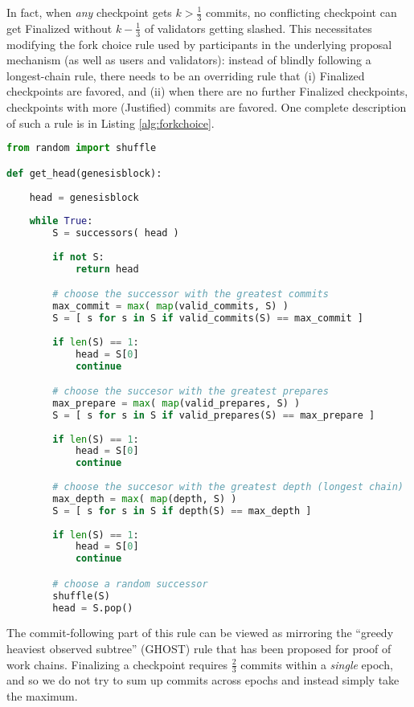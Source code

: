 \documentclass[12pt]{article}
\begin{document}
In fact, when \textit{any} checkpoint gets $k > \frac{1}{3}$ commits, no conflicting checkpoint can get Finalized without $k - \frac{1}{3}$ of validators getting slashed. This necessitates modifying the fork choice rule used by participants in the underlying proposal mechanism (as well as users and validators): instead of blindly following a longest-chain rule, there needs to be an overriding rule that (i) Finalized checkpoints are favored, and (ii) when there are no further Finalized checkpoints, checkpoints with more (Justified) commits are favored.  One complete description of such a rule is in Listing \ref{alg:forkchoice}.

\begin{lstlisting}[language=Python, caption={Algorithm for determining the head}, captionpos=b, label={alg:forkchoice}]
from random import shuffle

def get_head(genesisblock):
    
    head = genesisblock
    
    while True:
        S = successors( head )
        
        if not S:
            return head

        # choose the successor with the greatest commits
        max_commit = max( map(valid_commits, S) )        
        S = [ s for s in S if valid_commits(S) == max_commit ]
        
        if len(S) == 1:
            head = S[0]
            continue

        # choose the succesor with the greatest prepares
        max_prepare = max( map(valid_prepares, S) )
        S = [ s for s in S if valid_prepares(S) == max_prepare ]
        
        if len(S) == 1:
            head = S[0]
            continue
        
        # choose the succesor with the greatest depth (longest chain)
        max_depth = max( map(depth, S) )
        S = [ s for s in S if depth(S) == max_depth ]
        
        if len(S) == 1:
            head = S[0]
            continue

        # choose a random successor
        shuffle(S)
        head = S.pop()

\end{lstlisting}

The commit-following part of this rule can be viewed as mirroring the ``greedy heaviest observed subtree'' (GHOST) rule that has been proposed for proof of work chains\cite{sompolinsky2013accelerating}. Finalizing a checkpoint requires $\frac{2}{3}$ commits within a \textit{single} epoch,  and so we do not try to sum up commits across epochs and instead simply take the maximum.
\end{document}
